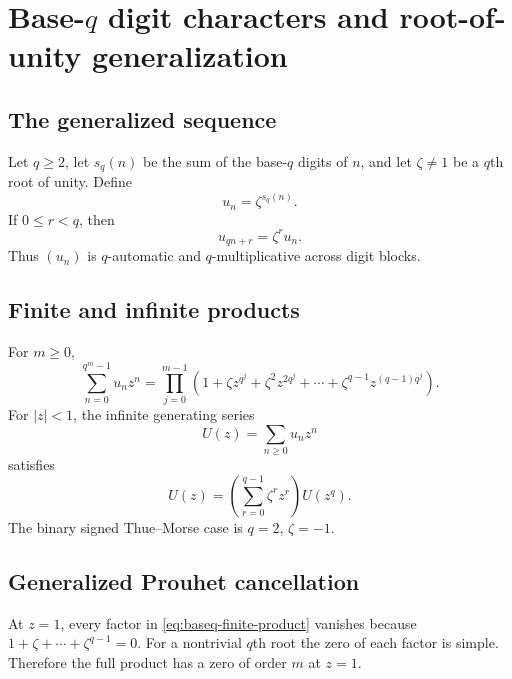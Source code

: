 \documentclass[11pt,oneside]{article}
\theoremstyle{definition}
\theoremstyle{remark}
\begin{document}
\section{\texorpdfstring{Base-$q$}{Base-q} digit characters and root-of-unity generalization}

\subsection{The generalized sequence}

Let $q\ge2$, let $s_q(n)$ be the sum of the base-$q$ digits of $n$, and let
$\zeta\ne1$ be a $q$th root of unity.  Define
\begin{equation}\label{eq:baseq-character}
 u_n=\zeta^{s_q(n)}.
\end{equation}
If $0\le r<q$, then
\begin{equation}\label{eq:baseq-recursion}
 u_{qn+r}=\zeta^r u_n.
\end{equation}
Thus $(u_n)$ is $q$-automatic and $q$-multiplicative across digit blocks.

\subsection{Finite and infinite products}

For $m\ge0$,
\begin{equation}\label{eq:baseq-finite-product}
 \sum_{n=0}^{q^m-1}u_nz^n
 =\prod_{j=0}^{m-1}
  \left(1+\zeta z^{q^j}+\zeta^2z^{2q^j}
  +\cdots+\zeta^{q-1}z^{(q-1)q^j}\right).
\end{equation}
For $|z|<1$, the infinite generating series
\begin{equation}\label{eq:baseq-infinite}
 U(z)=\sum_{n\ge0}u_nz^n
\end{equation}
satisfies
\begin{equation}\label{eq:baseq-mahler}
 U(z)=\left(\sum_{r=0}^{q-1}\zeta^rz^r\right)U(z^q).
\end{equation}
The binary signed Thue--Morse case is $q=2$, $\zeta=-1$.

\subsection{Generalized Prouhet cancellation}

At $z=1$, every factor in \cref{eq:baseq-finite-product} vanishes because
$1+\zeta+\cdots+\zeta^{q-1}=0$.  For a nontrivial $q$th root the zero of each
factor is simple.  Therefore the full product has a zero of order $m$ at
$z=1$.
\end{document}
